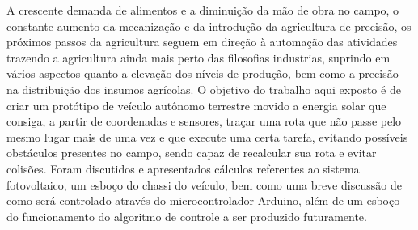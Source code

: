\begin{resumo}

A crescente demanda de alimentos e a diminuição da mão de obra no campo, o constante aumento da mecanização e da introdução da agricultura de precisão, os próximos passos da agricultura seguem em direção à automação das atividades trazendo a agricultura ainda mais perto das filosofias industrias, suprindo em vários aspectos   quanto a elevação dos níveis de produção, bem como a precisão na distribuição dos insumos agrícolas. O objetivo do trabalho aqui exposto é de criar um protótipo de veículo autônomo terrestre movido a energia solar que consiga, a partir de coordenadas e sensores, traçar uma rota que não passe pelo mesmo lugar mais de uma vez e que execute uma certa tarefa, evitando possíveis obstáculos presentes no campo, sendo capaz de recalcular sua rota e evitar colisões. Foram discutidos e apresentados cálculos referentes ao sistema fotovoltaico, um esboço do chassi do veículo, bem como uma breve discussão de como será controlado através do microcontrolador Arduino, além de um esboço do funcionamento do algoritmo de controle a ser produzido futuramente.


\end{resumo}